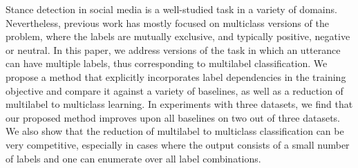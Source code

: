 Stance detection in social media is a well-studied task in a variety of domains. Nevertheless, previous work has mostly focused on multiclass versions of the problem, where the labels are mutually exclusive, and typically positive, negative or neutral. In this paper, we address versions of the task in which an utterance can have multiple labels, thus corresponding to multilabel classification. We propose a method that explicitly incorporates label dependencies in the training objective and compare it against a variety of baselines, as well as a reduction of multilabel to multiclass learning. In experiments with three datasets, we find that our proposed method  improves upon all baselines on two out of three datasets. We also show that the reduction of multilabel to multiclass classification can be very competitive, especially in cases where the output consists of a small number of labels and one can enumerate over all label combinations.